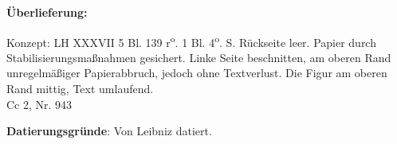 \begin{ledgroupsized}[r]{120mm}
\footnotesize 
\pstart 
\noindent\textbf{\"{U}berlieferung:}
\pend
\end{ledgroupsized}

 
\begin{ledgroupsized}[r]{114mm}
\footnotesize 
\pstart \parindent -6mm
Konzept: LH XXXVII 5 Bl. 139 r\textsuperscript{o}. 1 Bl. 4\textsuperscript{o}.  S. R\"{u}ckseite leer. Papier durch Stabilisierungsma{\ss}nahmen gesichert. Linke Seite beschnitten, am oberen Rand unregelm\"{a}{\ss}iger Papierabbruch, jedoch ohne Textverlust. Die Figur am oberen Rand mittig, Text umlaufend.\\ Cc 2, Nr. 943\pend
\end{ledgroupsized}
\vspace*{5mm}
\begin{ledgroup}
\footnotesize 
\pstart
\noindent\footnotesize{\textbf{Datierungsgr\"{u}nde}: Von Leibniz datiert.}
\pend
\end{ledgroup}

